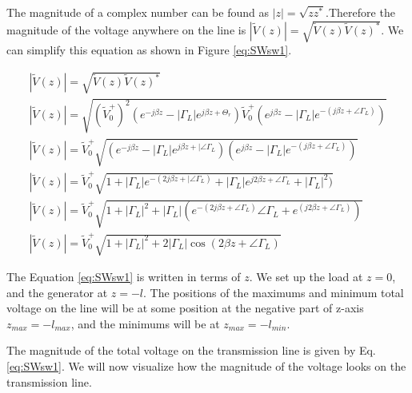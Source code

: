 \documentclass{ximera}
\begin{document}
The magnitude of a complex number can be found as $|z|=\sqrt{z
z^*}$.Therefore  the magnitude of the voltage anywhere on the line is $|\tilde{V}(z)|=\sqrt{\tilde{V}(z)
\tilde{V}(z)^*}$. We can simplify this equation as shown in Figure \ref{eq:SWsw1}.

\begin{eqnarray}
|\tilde{V}(z)|=\sqrt{\tilde{V}(z) \tilde{V}(z)^*} \nonumber  \\
|\tilde{V}(z)|=\sqrt{   (\tilde{V}_0^+)^2 (e^{-j \beta z} - |\Gamma_L|  e^{j \beta z +
 \Theta_r}  )  
   \tilde{V}_0^+ (e^{j \beta z} - |\Gamma_L|  e^{-(j \beta z + \angle \Gamma_L)}     )} \nonumber
\\
|\tilde{V}(z)|= \tilde{V}_0^+ \sqrt{(e^{-j \beta z} - |\Gamma_L|  e^{j \beta z +
|\angle \Gamma_L}  )  
  (e^{j \beta z} - |\Gamma_L|  e^{-(j \beta z + \angle \Gamma_L)}     )}
\nonumber \\
|\tilde{V}(z)|= \tilde{V}_0^+ \sqrt{1+  |\Gamma_L|  e^{-(2j \beta z +
|\angle \Gamma_L)}    + |\Gamma_L|  e^{j 2 \beta z + \angle \Gamma_L} +|\Gamma_L|^2     )}
\nonumber \\
|\tilde{V}(z)|= \tilde{V}_0^+ \sqrt{1+ |\Gamma_L|^2 + |\Gamma_L| ( e^{-(2j \beta z +
 \angle \Gamma_L)} \angle \Gamma_L  +  e^{(j 2 \beta z + \angle \Gamma_L)}     )}
 \nonumber \\
|\tilde{V}(z)|= \tilde{V}_0^+  \sqrt{1+ |\Gamma_L|^2 + 2 |\Gamma_L| \cos(2 \beta z +\angle \Gamma_L)} \label{eq:SWsw1} 
\end{eqnarray}

The Equation \ref{eq:SWsw1} is written in terms of $z$. We set up the load at $z=0$, and the generator at $z=-l$. The positions of the maximums and minimum total voltage on the line will be at some position at the negative part of z-axis $z_{max}=-l_{max}$, and the minimums will be at $z_{max}=-l_{min}$.

The magnitude of the total voltage on the transmission line is given
by Eq.\ref{eq:SWsw1}. We will now visualize how the magnitude of the voltage looks on the transmission line.
\end{document}
